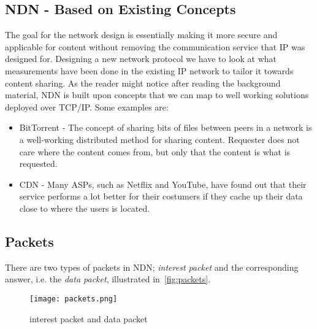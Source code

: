 \subsection{NDN - Based on Existing Concepts}
The goal for the network design is essentially making it more secure and applicable for content without removing the communication service that \gls{IP} was designed for. 
Designing a new network protocol we have to look at what measurements have been done in the existing \gls{IP} network to tailor it towards content sharing.
As the reader might notice after reading the background material, \gls{NDN} is built upon concepts that we can map to well working solutions deployed over \gls{TCP}/\gls{IP}.
Some examples are:
\begin{itemize}
  \item BitTorrent - 
  The concept of sharing bits of files between peers in a network is a well-working distributed method for sharing content. 
  Requester does not care where the content comes from, but only that the content is what is requested.
  \item \gls{CDN} - 
  Many \gls{ASP}s, such as Netflix and YouTube, have found out that their service performs a lot better for their costumers if they cache up their \gls{data} close to where the users is located.
\end{itemize}

\subsection{Packets}\label{packets}
There are two types of packets in \gls{NDN};
\textit{\gls{interest} packet} and the corresponding answer, i.e. the \textit{\gls{data} packet}, illustrated in~\autoref{fig:packets}.

\begin{figure}[H]
  \centering
  \texttt{[image: packets.png]}
  \caption{\gls{interest} packet and \gls{data} packet}
  \label{fig:packets}
\end{figure}

